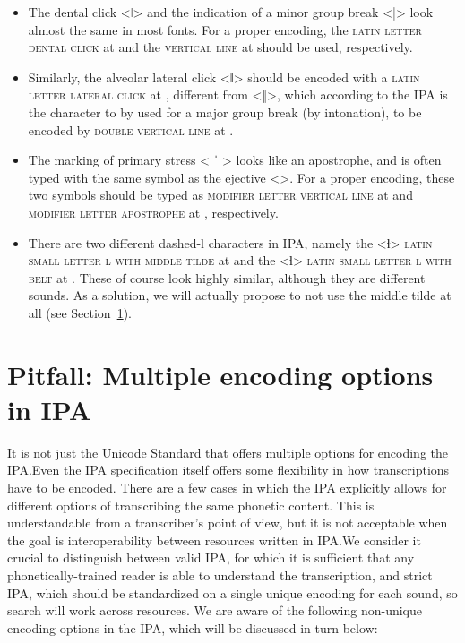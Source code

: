 \begin{itemize}
  
   \item The dental click <ǀ> and the indication of a minor group break <|>
           look almost the same in
           most fonts. For a proper encoding, the \textsc{latin letter dental
           click} at  and the \textsc{vertical line }at  
           should be used, respectively.
   \item Similarly, the alveolar lateral click <ǁ>	should be encoded with a
           \textsc{latin letter lateral click} at , different from <‖>, 
           which according to the IPA is the character to by used for a major group 
           break (by intonation), to be encoded by \textsc{double vertical line} 
           at .
   \item The marking of primary stress < ˈ > looks like an apostrophe, and
           is often typed with the same symbol as the ejective <>. For a
           proper encoding, these two symbols should be typed as 
           \textsc{modifier letter vertical line} at  and
           \textsc{modifier letter apostrophe} at , respectively. 
   \item There are two different dashed-l characters in IPA, namely the <ɫ> 	      \textsc{latin small letter l with middle tilde} at  and the <ɬ>	      \textsc{latin small letter l with belt} at . These of course
          look highly similar, although they are different sounds. As a solution, 
          we will actually propose to not use the middle tilde at all 
          (see Section~\ref{pitfall-multiple-options-ipa}).     
   
\end{itemize}

\section{Pitfall: Multiple encoding options in IPA}
\label{pitfall-multiple-options-ipa}     

It is not just the Unicode Standard that offers multiple options for encoding
the IPA.\@ Even the IPA specification itself offers some flexibility in how
transcriptions have to be encoded. There are a few cases in which the IPA
explicitly allows for different options of transcribing the same phonetic
content. This is understandable from a transcriber's point of view, but it is
not acceptable when the goal is interoperability between resources written in
IPA.\@ We consider it crucial to distinguish between valid IPA, for which it
is sufficient that any phonetically-trained reader is able to understand the
transcription, and strict IPA, which should be standardized on a single
unique encoding for each sound, so search will work across resources. We are
aware of the following non-unique encoding options in the IPA, which will be
discussed in turn below:

